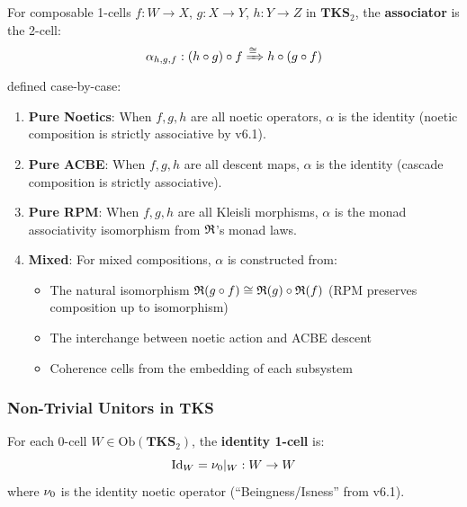 \begin{definition}
\label{def:tks-associator}
For composable 1-cells $f : W \to X$, $g : X \to Y$, $h : Y \to Z$ in $\mathbf{TKS}_2$,
the \textbf{associator} is the 2-cell:
\[
  \alpha_{h,g,f} : (h \circ g) \circ f \xRightarrow{\cong} h \circ (g \circ f)
\]
defined case-by-case:
\begin{enumerate}[label=(\roman*)]
  \item \textbf{Pure Noetics}: When $f, g, h$ are all noetic operators, $\alpha$ is the
        identity (noetic composition is strictly associative by v6.1).
  \item \textbf{Pure ACBE}: When $f, g, h$ are all descent maps, $\alpha$ is the identity
        (cascade composition is strictly associative).
  \item \textbf{Pure RPM}: When $f, g, h$ are all Kleisli morphisms, $\alpha$ is the
        monad associativity isomorphism from $\mathfrak{R}$'s monad laws.
  \item \textbf{Mixed}: For mixed compositions, $\alpha$ is constructed from:
        \begin{itemize}
          \item The natural isomorphism $\mathfrak{R}(g \circ f) \cong \mathfrak{R}(g) \circ \mathfrak{R}(f)$
                (RPM preserves composition up to isomorphism)
          \item The interchange between noetic action and ACBE descent
          \item Coherence cells from the embedding of each subsystem
        \end{itemize}
\end{enumerate}
\end{definition}

\subsubsection{Non-Trivial Unitors in TKS}

\begin{definition}
\label{def:tks-identity}
For each 0-cell $W \in \mathrm{Ob}(\mathbf{TKS}_2)$, the \textbf{identity 1-cell} is:
\[
  \mathrm{Id}_W = \nu_{0}|_W : W \to W
\]
where $\nu_{0}$ is the identity noetic operator (``Beingness/Isness'' from v6.1).
\end{definition}

